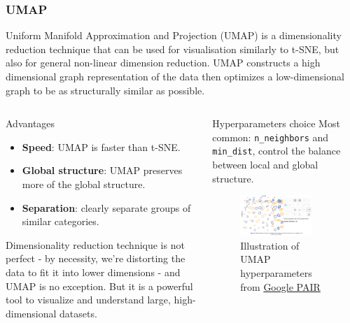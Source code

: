 \documentclass[10pt, aspectratio = 169]{beamer}
\begin{document}
\begin{frame}
    \frametitle{UMAP}
    \small
    Uniform Manifold Approximation and Projection (UMAP) is a dimensionality 
    reduction technique that can be used for visualisation similarly to t-SNE,
    but also for general non-linear dimension reduction.
    UMAP constructs a high dimensional graph representation of the data 
    then optimizes a low-dimensional graph to be as structurally similar as possible.
    \begin{columns}[t]
        \begin{column}{0.6\textwidth}
            \begin{block}{Advantages}
                
                \begin{itemize}
                    \scriptsize
                    \item \textbf{Speed}: UMAP is faster than t-SNE.
                    \item \textbf{Global structure}: UMAP preserves more of the global structure.
                    \item \textbf{Separation}: clearly separate groups of similar categories.
                \end{itemize}
            \end{block}
            Dimensionality reduction technique is not perfect - by necessity, we're distorting the data to fit it into lower dimensions - 
            and UMAP is no exception. But it is a powerful tool to visualize and understand large, high-dimensional datasets.
        \end{column}
        \begin{column}{0.4\textwidth}
            \begin{alertblock}{Hyperparameters choice}
                \scriptsize
                Most common: \texttt{n\_neighbors} and \texttt{min\_dist}, control the balance between local and global structure.

            \end{alertblock}
            \begin{figure}
                \includegraphics[width=0.8\textwidth]{figures/UMAP_hyperparam.png}
                \caption{\scriptsize Illustration of UMAP hyperparameters from 
                    \href{https://pair-code.github.io/understanding-umap/index.html}{Google PAIR}}
                

\end{figure}
\end{column}
\end{columns}
\end{frame}
\end{document}
